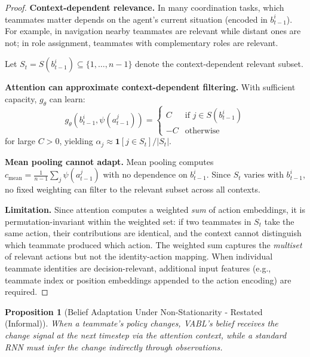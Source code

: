 \documentclass{article}
\theoremstyle{plain}
\newtheorem{proposition}[theorem]{Proposition}
\theoremstyle{definition}
\theoremstyle{remark}
\begin{document}
\begin{proof}
\textbf{Context-dependent relevance.}
In many coordination tasks, which teammates matter depends on the agent's current situation (encoded in $b_{t-1}^i$). For example, in navigation nearby teammates are relevant while distant ones are not; in role assignment, teammates with complementary roles are relevant.

Let $S_t = S(b_{t-1}^i) \subseteq \{1, \ldots, n-1\}$ denote the context-dependent relevant subset.

\textbf{Attention can approximate context-dependent filtering.}
With sufficient capacity, $g_\theta$ can learn:
\[
g_\theta(b_{t-1}^i, \psi(a_{t-1}^j)) = \begin{cases} C & \text{if } j \in S(b_{t-1}^i) \\ -C & \text{otherwise} \end{cases}
\]
for large $C > 0$, yielding $\alpha_j \approx \mathbf{1}[j \in S_t] / |S_t|$.

\textbf{Mean pooling cannot adapt.}
Mean pooling computes $c_{\mathrm{mean}} = \frac{1}{n-1}\sum_j \psi(a_{t-1}^j)$ with no dependence on $b_{t-1}^i$. Since $S_t$ varies with $b_{t-1}^i$, no fixed weighting can filter to the relevant subset across all contexts.

\textbf{Limitation.}
Since attention computes a weighted \emph{sum} of action embeddings, it is permutation-invariant within the weighted set: if two teammates in $S_t$ take the same action, their contributions are identical, and the context cannot distinguish which teammate produced which action. The weighted sum captures the \emph{multiset} of relevant actions but not the identity-action mapping. When individual teammate identities are decision-relevant, additional input features (e.g., teammate index or position embeddings appended to the action encoding) are required.
\end{proof}

\begin{proposition}[Belief Adaptation Under Non-Stationarity - Restated (Informal)]
When a teammate's policy changes, VABL's belief receives the change signal at the next timestep via the attention context, while a standard RNN must infer the change indirectly through observations.
\end{proposition}
\end{document}
